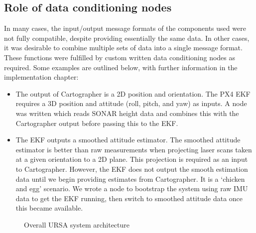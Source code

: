 \documentclass[capstone_report.tex]{subfiles}
\begin{document}
\subsection{Role of data conditioning nodes}
In many cases, the input/output message formats of the components used were not fully compatible, despite providing essentially the same data. In other cases, it was desirable to combine multiple sets of data into a single message format. These functions were fulfilled by custom written data conditioning nodes as required. Some examples are outlined below, with further information in the implementation chapter:

\begin{itemize}
	\item The output of Cartographer is a 2D position and orientation. The PX4 EKF requires a 3D position and attitude (roll, pitch, and yaw) as inputs. A node was written which reads SONAR height data and combines this with the Cartographer output before passing this to the EKF.
	\item The EKF outputs a smoothed attitude estimator. The smoothed attitude estimator is better than raw measurements when projecting laser scans taken at a given orientation to a 2D plane. This projection is required as an input to Cartographer. However, the EKF does not output the smooth estimation data until we begin providing estimates from Cartographer. It is a `chicken and egg' scenario. We wrote a node to bootstrap the system using raw IMU data to get the EKF running, then switch to smoothed attitude data once this became available.
\end{itemize}

\pagebreak
\begin{landscape}
\thispagestyle{empty}
\hspace{0pt}
\vfill
\begin{figure}[H]
	\centering
	
	\caption{Overall URSA system architecture\label{fig:overArch}}
\end{figure}
\vfill
\end{landscape}
\pagebreak
\end{document}
